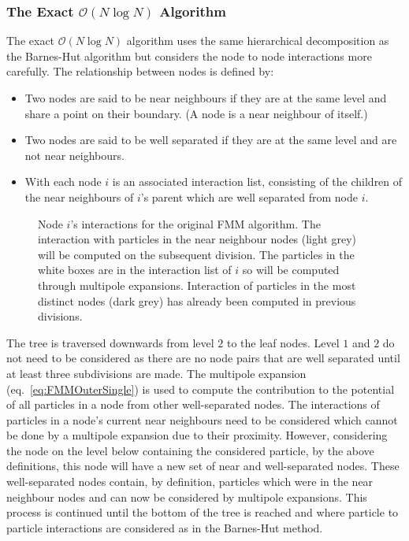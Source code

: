 \subsubsection{\texorpdfstring{The Exact $\mathcal{O}(N\log N)$ Algorithm}{The Exact O(N log N) Algorithm}} \label{subsec:ExactNlogN}
The exact $\mathcal{O}(N\log N)$ algorithm uses the same hierarchical decomposition as the Barnes-Hut algorithm but considers the node to node interactions more carefully. The relationship between nodes is defined by:
\begin{itemize}
    \item Two nodes are said to be near neighbours if they are at the same level and share a point on their boundary. (A node is a near neighbour of itself.)
    \item Two nodes are said to be well separated if they are at the same level and are not near neighbours.
    \item With each node $i$ is an associated interaction list, consisting of the children of the near neighbours of $i$’s parent which are well separated from node $i$.
\end{itemize}

\begin{figure}
    \centering
        \resizebox{.4\linewidth}{!}{}
    \caption[Node $i$'s interactions for the original FMM algorithm.]{Node $i$'s interactions for the original FMM algorithm. The interaction with particles in the near neighbour nodes (light grey) will be computed on the subsequent division. The particles in the white boxes are in the interaction list of $i$ so will be computed through multipole expansions. Interaction of particles in the most distinct nodes (dark grey) has already been computed in previous divisions.}
    \label{fig:FMMDecomp}
\end{figure}

The tree is traversed downwards from level $2$ to the leaf nodes. Level $1$ and $2$ do not need to be considered as there are no node pairs that are well separated until at least three subdivisions are made. The multipole expansion (eq.~\ref{eq:FMMOuterSingle}) is used to compute the contribution to the potential of all particles in a node from other well-separated nodes. The interactions of particles in a node's current near neighbours need to be considered which cannot be done by a multipole expansion due to their proximity. However, considering the node on the level below containing the considered particle, by the above definitions, this node will have a new set of near and well-separated nodes. These well-separated nodes contain, by definition, particles which were in the near neighbour nodes and can now be considered by multipole expansions. This process is continued until the bottom of the tree is reached and where particle to particle interactions are considered as in the Barnes-Hut method. 

